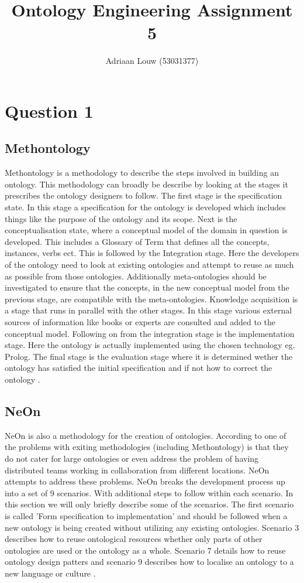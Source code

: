 \documentclass[12pt,a4paper]{article}
\title{Ontology Engineering Assignment 5}
\author{Adriaan Louw (53031377)}
\begin{document}
\maketitle
\newpage
\section{Question 1}

\subsection{Methontology}

Methontology \citep{fernandez} is a methodology to describe the steps involved in building an ontology. This methodology can broadly be describe by looking at the stages it prescribes the ontology designers to follow. The first stage is the specification state. In this stage a specification for the ontology is developed which includes things like the purpose of the ontology and its scope. Next is the conceptualisation state, where a conceptual model of the domain in question is developed. This includes a Glossary of Term that defines all the concepts, instances, verbs ect. This is followed by the Integration stage. Here the developers of the ontology need to look at existing ontologies and attempt to reuse as much as possible from those ontologies. Additionally meta-ontologies should be investigated to ensure that the concepts, in the new conceptual model from the previous stage, are compatible with the meta-ontologies. Knowledge acquisition is a stage that runs in parallel with the other stages. In this stage various external sources of information like books or experts are consulted and added to the conceptual model. Following on from the integration stage is the implementation stage. Here the ontology is actually implemented using the chosen technology eg. Prolog. The final stage is the evaluation stage where it is determined wether the ontology has satisfied the initial specification and if not how to correct the ontology \citep{fernandez}.

\subsection{NeOn}
NeOn \citep{gomez} is also a methodology for the creation of ontologies. According to \cite{gomez} one of the problems with exiting methodologies (including Methontology) is that they do not cater for large ontologies or even address the problem of having distributed teams working in collaboration from different locations. NeOn attempts to address these problems. NeOn breaks the development process up into a set of 9 scenarios. With additional steps to follow within each scenario. In this section we will only briefly describe some of the scenarios. The first scenario is called 'Form specification to implementation' and should be followed when a new ontology is being created without utilizing any existing ontologies. Scenario 3 describes how to reuse ontological resources whether only parts of other ontologies are used or the ontology as a whole. Scenario 7 details how to reuse ontology design patters and scenario 9 describes how to localise an ontology to a new language or culture \cite{gomez}.   
\end{document}
